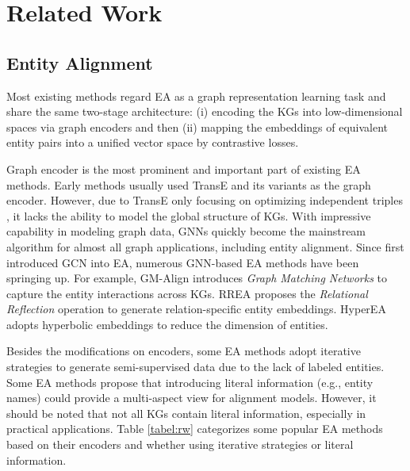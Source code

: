 \documentclass[11pt]{article}
\begin{document}
\section{Related Work}
\subsection{Entity Alignment}
Most existing methods regard EA as a graph representation learning task and share the same two-stage architecture: (i) encoding the KGs into low-dimensional spaces via graph encoders and then (ii) mapping the embeddings of equivalent entity pairs into a unified vector space by contrastive losses.

Graph encoder is the most prominent and important part of existing EA methods.
Early methods usually used TransE \cite{DBLP:conf/nips/BordesUGWY13} and its variants as the graph encoder.
However, due to TransE only focusing on optimizing independent triples , it lacks the ability to model the global structure of KGs.
With impressive capability in modeling graph data, GNNs quickly become the mainstream algorithm for almost all graph applications, including entity alignment.
Since \citet{DBLP:conf/emnlp/WangLLZ18} first introduced GCN into EA, numerous GNN-based EA methods have been springing up.
For example, GM-Align \cite{DBLP:conf/acl/XuWYFSWY19} introduces \emph{Graph Matching Networks} to capture the entity interactions across KGs.
RREA \cite{DBLP:conf/cikm/MaoWXWL20} proposes the \emph{Relational Reflection} operation to generate relation-specific entity embeddings.
HyperEA \cite{DBLP:conf/emnlp/SunCHWDZ20} adopts hyperbolic embeddings to reduce the dimension of entities.

Besides the modifications on encoders, some EA methods adopt iterative strategies to generate semi-supervised data due to the lack of labeled entities.
Some EA methods propose that introducing literal information (e.g., entity names) could provide a multi-aspect view for alignment models.
However, it should be noted that not all KGs contain literal information, especially in practical applications.
Table \ref{tabel:rw} categorizes some popular EA methods based on their encoders and whether using iterative strategies or literal information.
\end{document}

